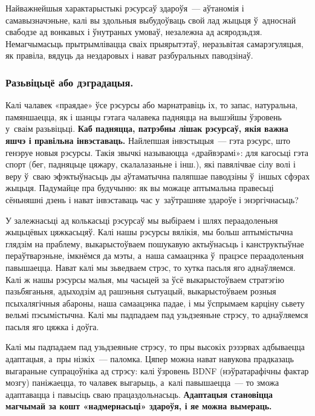 Найважнейшыя характарыстыкі рэсурсаў здароўя~--- аўтаномія і самавызначэньне, калі вы здольныя выбудоўваць свой лад жыцьця ў~адноснай свабодзе ад вонкавых і ўнутраных умоваў, незалежна ад асяродзьдзя. Немагчымасьць прытрымлівацца сваіх прыярытэтаў, неразьвітая самарэгуляцыя, як правіла, вядуць да нездаровых і нават разбуральных паводзінаў.

\subsubsection{Разьвіцьцё або дэградацыя.} 

Калі чалавек «праядае» ўсе рэсурсы або марнатравіць іх, то запас, натуральна, памяншаецца, як і шанцы гэтага чалавека падняцца на вышэйшы ўзровень у~сваім разьвіцьці. \textbf{Каб падняцца, патрэбны лішак рэсурсаў, якія важна яшчэ і правільна інвэставаць.} Найлепшая інвэстыцыя~--- гэта рэсурс, што генэруе новыя рэсурсы. Такія звычкі называюцца «драйвэрамі»: для кагосьці гэта спорт (бег, падняцьце цяжару, скалалазаньне і інш.), які павялічвае сілу волі і веру ў~сваю эфэктыўнасьць ды аўтаматычна паляпшае паводзіны ў~іншых сфэрах жыцьця. Падумайце пра будучыню: як вы можаце аптымальна правесьці сёньняшні дзень і нават інвэставаць час у~заўтрашняе здароўе і энэргічнасьць?


У залежнасьці ад колькасьці рэсурсаў мы выбіраем і шлях пераадоленьня жыцьцёвых цяжкасьцяў. Калі нашы рэсурсы вялікія, мы больш аптымістычна глядзім на праблему, выкарыстоўваем пошукавую актыўнасьць і канструктыўнае пераўтварэньне, імкнёмся да мэты, а~наша самаацэнка ў~працэсе пераадоленьня павышаецца. Нават калі мы зьведваем стрэс, то хутка пасьля яго аднаўляемся. Калі ж нашы рэсурсы малыя, мы часьцей за ўсё выкарыстоўваем стратэгію пазьбяганьня, адыходзім ад рашэньня сытуацый, выкарыстоўваем розныя псыхалягічныя абароны, наша самаацэнка падае, і мы ўспрымаем карціну сьвету вельмі пэсымістычна. Калі мы падпадаем пад узьдзеяньне стрэсу, то аднаўляемся пасьля яго цяжка і доўга.

Калі мы падпадаем пад узьдзеяньне стрэсу, то пры высокіх рэзэрвах адбываецца адаптацыя, а~пры нізкіх~--- паломка. Цяпер можна нават навукова прадказаць выгараньне супрацоўніка ад стрэсу: калі ўзровень BDNF (нэўратарафічны фактар мозгу) паніжаецца, то чалавек выгарыць, а~калі павышаецца~--- то зможа адаптавацца і павысіць сваю працаздольнасьць. \textbf{Адаптацыя становіцца магчымай за кошт «надмернасьці» здароўя, і яе можна вымераць.}

